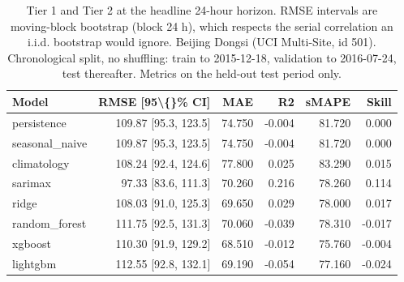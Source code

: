 \begin{table}[htbp]
\caption{Tier 1 and Tier 2 at the headline 24-hour horizon. RMSE intervals are moving-block bootstrap (block 24 h), which respects the serial correlation an i.i.d. bootstrap would ignore. Beijing Dongsi (UCI Multi-Site, id 501). Chronological split, no shuffling: train to 2015-12-18, validation to 2016-07-24, test thereafter. Metrics on the held-out test period only.}
\label{tab:tier1_tier2_h24}
\begin{tabular}{lrrrrr}
\toprule
Model & RMSE [95\textbackslash\{\}\% CI] & MAE & R2 & sMAPE & Skill \\
\midrule
persistence & 109.87 [95.3, 123.5] & 74.750 & -0.004 & 81.720 & 0.000 \\
seasonal\_naive & 109.87 [95.3, 123.5] & 74.750 & -0.004 & 81.720 & 0.000 \\
climatology & 108.24 [92.4, 124.6] & 77.800 & 0.025 & 83.290 & 0.015 \\
sarimax & 97.33 [83.6, 111.3] & 70.260 & 0.216 & 78.260 & 0.114 \\
ridge & 108.03 [91.0, 125.3] & 69.650 & 0.029 & 78.000 & 0.017 \\
random\_forest & 111.75 [92.5, 131.3] & 70.060 & -0.039 & 78.310 & -0.017 \\
xgboost & 110.30 [91.9, 129.2] & 68.510 & -0.012 & 75.760 & -0.004 \\
lightgbm & 112.55 [92.8, 132.1] & 69.190 & -0.054 & 77.160 & -0.024 \\
\bottomrule
\end{tabular}
\end{table}
